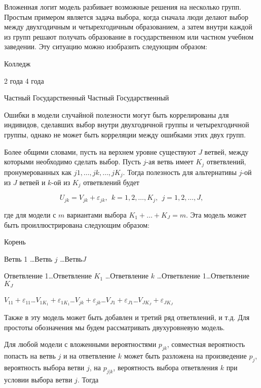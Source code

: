 Вложенная логит модель разбивает возможные решения на несколько групп. Простым примером является задача выбора, когда сначала люди делают выбор между двухгодичным и четырехгодичным образованием, а затем внутри каждой из групп решают получать образование в государственном или частном учебном заведении. Эту ситуацию можно изобразить следующим образом:


Колледж

2 года               4 года

Частный Государственный Частный Государственный



Ошибки в модели случайной полезности могут быть коррелированы для индивидов, сделавших выбор внутри двухгодичной группы  и четырехгодичной группы, однако не может быть корреляции между ошибками этих двух групп.

Более общими словами, пусть на верхнем уровне существуют $J$ ветвей, между которыми необходимо сделать выбор. Пусть $j$-ая ветвь имеет $K_j$ ответвлений, пронумерованных как $j1,\dots ,jk,\dots ,jK_j.$ Тогда полезность для альтернативы $j$-ой из $J$ ветвей и $k$-ой из $K_j$ ответвлений будет

\begin{equation} \label{GrindEQ__15_32_} U_{jk}=V_{jk}+{\varepsilon }_{jk},\ \ k=1,2,\dots ,K_j,\ \ j=1,2,\dots ,J, \end{equation} 

где для модели с $m$ вариантами выбора $K_1+\dots +K_J=m.$ Эта модель может быть проиллюстрирована следующим образом:

Корень



Ветвь 1  \dots  Ветвь $j$ \dots  Ветвь$J$



Ответвление 1\dots Ответвление $K_1$   \dots      Ответвление $k$      \dots      Ответвление 1\dots Ответвление $K_J$

$V_{11}+{\varepsilon }_{11}$\dots $V_{1K_1}+{\varepsilon }_{1K_1}$\dots $V_{jk}+{\varepsilon }_{jk}$\dots $V_{J1}+{\varepsilon }_{J1}$\dots $V_{JK_J}+{\varepsilon }_{JK_J}$

Также в эту модель может быть добавлен и третий ряд ответвлений, и т.д. Для простоты обозначения мы будем рассматривать двухуровневую модель.

Для любой модели с вложенными вероятностями $p_{jk}$, совместная вероятность попасть на ветвь $j$ и на ответвление $k$ может быть разложена на произведение $p_j$, вероятность выбора ветви $j$, на $p_{j|k}$, вероятность выбора ответвления $k$ при условии выбора ветви $j$. Тогда

